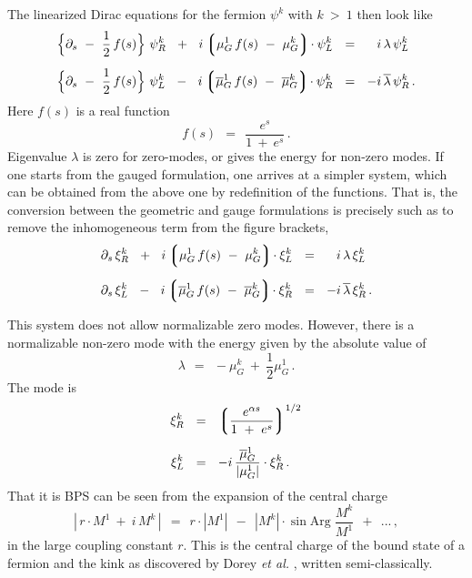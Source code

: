 \documentclass[epsfig,12pt]{article}
\def\beq{\begin{equation}}
\def\eeq{\end{equation}}
\def\beq{\begin{equation}}
\def\eeq{\end{equation}}
\newcommand{\p}{\partial}
\newcommand{\ov}{\overline}
\newcommand{\lgr}{\left\lgroup}
\newcommand{\rgr}{\right\rgroup}
\begin{document}
       The linearized Dirac equations for the fermion $ \psi^k $ with $ k ~>~ 1 $ then look like
\begin{align}
%
\notag
       \Big\{ \p_s  ~-~ \frac{1}{2}\, f(s) \Big\}\,\, \psi_R^k   ~~+~~  i \lgr  \mu_G^1\, f(s)  ~-~  \mu_G^k \rgr\! \cdot \psi_L^k  
       & ~~=~~ \phantom{-} i\, \lambda\, \psi_L^k   \\[2mm]
%
       \Big\{ \p_s  ~-~ \frac{1}{2}\, f(s) \Big\}\,\, \psi_L^k   ~~-~~  i \lgr \ov{\mu}{}_G^1\, f(s)  ~-~ \ov{\mu}{}_G^k \rgr\! \cdot \psi_R^k 
       & ~~=~~ - i\, \ov{\lambda}\, \psi_R^k \,.
\end{align}
       Here $ f(s) $ is a real function
\beq
       f(s) ~~=~~ \frac{     e^s     }
                       { 1  ~+~  e^s }\,.
\eeq
       Eigenvalue $ \lambda $ is zero for zero-modes, or gives the energy for non-zero modes.
       If one starts from the gauged formulation, one arrives at a simpler system, which can be obtained from the
       above one by redefinition of the functions.
       That is, the conversion between the geometric and gauge formulations is precisely such as to remove the inhomogeneous term from the
       figure brackets,
\begin{align}
%
\notag
       \p_s\, \xi_R^k  ~~+~~  i \lgr \mu_G^1\, f(s) ~-~ \mu_G^k \rgr\! \cdot \xi_L^k  & ~~=~~ \phantom{-} i\, \lambda\, \xi_L^k \\[2mm]
%
       \p_s\, \xi_L^k  ~~-~~  i \lgr \ov{\mu}{}_G^1\, f(s) ~-~ \ov{\mu}{}_G^k \rgr\! \cdot \xi_R^k & ~~=~~ - i\, \ov{\lambda}\, \xi_R^k \,.
\end{align}
       
       This system does not allow normalizable zero modes.
       However, there is a normalizable non-zero mode with the energy given by the absolute value of 
\beq
       \lambda  ~~=~~  - \mu_G^k  ~+~ \frac{1}{2} \mu_G^1\,.
\eeq
       The mode is
\begin{align}
%
\notag
       \xi_R^k  & ~~=~~  \lgr \frac{  e^{\alpha s}  }
                                   {   1 ~+~ e^s    }  \rgr^{ 1/2 }  \\[2mm]
%
       \xi_L^k  & ~~=~~  - i\, \frac{ \ov{\mu}{}_G^1 }
                                    {  | \mu_G^1 |   } \cdot \xi_R^k\,.
\end{align}
       That it is BPS can be seen from the expansion of the central charge
\beq
       |\, r \cdot M^1  ~+~ i\, M^k \,|  ~~=~~ r \cdot | M^1 |  ~~-~~ | M^k | \cdot \sin \text{Arg}\; \frac { M^k } 
                                                                                                            { M^1 }  
                                                                ~~+~~ ... \,,
\eeq
       in the large coupling constant $ r $.
       This is the central charge of the bound state of a fermion and the kink 
       as discovered by Dorey {\it et al.} \cite{Dorey:1999zk}, written semi-classically.
\end{document}

